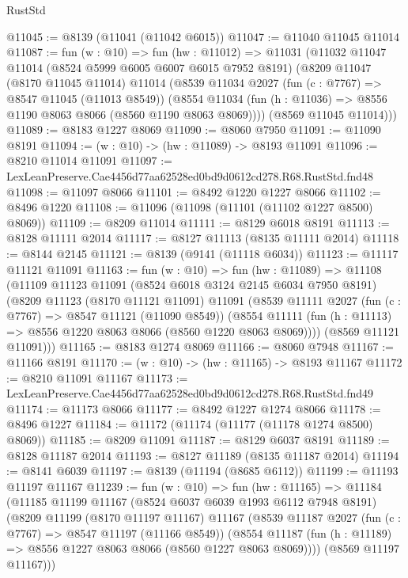 \begin{lexlean}{RustStd}
\begin{coremodule}
@11045 := @8139 (@11041 (@11042 @6015))
@11047 := @11040 @11045 @11014
@11087 := fun (w : @10) =>
  fun (hw : @11012) =>
  @11031
    (@11032
      @11047
      @11014
      (@8524 @5999 @6005 @6007 @6015 @7952 @8191)
      (@8209
        @11047
        (@8170 @11045 @11014)
        @11014
        (@8539
          @11034
          @2027
          (fun (c : @7767) => @8547 @11045 (@11013 @8549))
          (@8554 @11034 (fun (h : @11036) => @8556 @1190 @8063 @8066 (@8560 @1190 @8063 @8069))))
        (@8569 @11045 @11014)))
@11089 := @8183 @1227 @8069
@11090 := @8060 @7950
@11091 := @11090 @8191
@11094 := (w : @10) -> (hw : @11089) -> @8193 @11091
@11096 := @8210 @11014 @11091
@11097 := LexLeanPreserve.Cae4456d77aa62528ed0bd9d0612cd278.R68.RustStd.fnd48
@11098 := @11097 @8066
@11101 := @8492 @1220 @1227 @8066
@11102 := @8496 @1220
@11108 := @11096 (@11098 (@11101 (@11102 @1227 @8500) @8069))
@11109 := @8209 @11014
@11111 := @8129 @6018 @8191
@11113 := @8128 @11111 @2014
@11117 := @8127 @11113 (@8135 @11111 @2014)
@11118 := @8144 @2145
@11121 := @8139 (@9141 (@11118 @6034))
@11123 := @11117 @11121 @11091
@11163 := fun (w : @10) =>
  fun (hw : @11089) =>
  @11108
    (@11109
      @11123
      @11091
      (@8524 @6018 @3124 @2145 @6034 @7950 @8191)
      (@8209
        @11123
        (@8170 @11121 @11091)
        @11091
        (@8539
          @11111
          @2027
          (fun (c : @7767) => @8547 @11121 (@11090 @8549))
          (@8554 @11111 (fun (h : @11113) => @8556 @1220 @8063 @8066 (@8560 @1220 @8063 @8069))))
        (@8569 @11121 @11091)))
@11165 := @8183 @1274 @8069
@11166 := @8060 @7948
@11167 := @11166 @8191
@11170 := (w : @10) -> (hw : @11165) -> @8193 @11167
@11172 := @8210 @11091 @11167
@11173 := LexLeanPreserve.Cae4456d77aa62528ed0bd9d0612cd278.R68.RustStd.fnd49
@11174 := @11173 @8066
@11177 := @8492 @1227 @1274 @8066
@11178 := @8496 @1227
@11184 := @11172 (@11174 (@11177 (@11178 @1274 @8500) @8069))
@11185 := @8209 @11091
@11187 := @8129 @6037 @8191
@11189 := @8128 @11187 @2014
@11193 := @8127 @11189 (@8135 @11187 @2014)
@11194 := @8141 @6039
@11197 := @8139 (@11194 (@8685 @6112))
@11199 := @11193 @11197 @11167
@11239 := fun (w : @10) =>
  fun (hw : @11165) =>
  @11184
    (@11185
      @11199
      @11167
      (@8524 @6037 @6039 @1993 @6112 @7948 @8191)
      (@8209
        @11199
        (@8170 @11197 @11167)
        @11167
        (@8539
          @11187
          @2027
          (fun (c : @7767) => @8547 @11197 (@11166 @8549))
          (@8554 @11187 (fun (h : @11189) => @8556 @1227 @8063 @8066 (@8560 @1227 @8063 @8069))))
        (@8569 @11197 @11167)))

\end{coremodule}
\end{lexlean}
